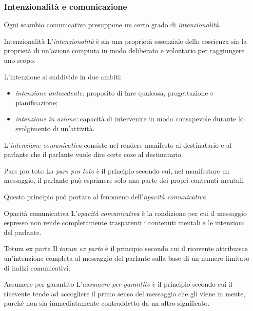 \documentclass[a4paper]{article}
\begin{document}
\subsubsection{Intenzionalità e comunicazione}
Ogni scambio comunicativo presuppone un certo grado di \emph{intenzionalità}.
\begin{snippetdefinition}{Intenzionalità}
    L'\emph{intenzionalità} è sia una proprietà essenziale della coscienza sia la proprietà di un'azione compiuta in modo deliberato e volontario per raggiungere uno scopo.
\end{snippetdefinition}
L'intenzione si suddivide in due ambiti:
\begin{itemize}
    \item \emph{intenzione antecedente:} proposito di fare qualcosa, progettazione e pianificazione;
    \item \emph{intenzione in azione:} capacità di intervenire in modo consapevole durante lo svolgimento di un'attività.
\end{itemize}
L'\emph{intenzione comunicativa} consiste nel rendere manifesto al destinatario e al parlante che il parlante vuole dire certe cose al destinatario.
\begin{snippetdefinition}{Pars pro toto}
    La \emph{pars pro toto} è il principio secondo cui, nel manifestare un messaggio, il parlante può esprimere solo una parte dei propri contenuti mentali.
\end{snippetdefinition}
Questo principio può portare al fenomeno dell'\emph{opacità comunicativa}.
\begin{snippetdefinition}{Opacità comunicativa}
    L'\emph{opacità comunicativa} è la condizione per cui il messaggio espresso non rende completamente trasparenti i contenuti mentali e le intenzioni del parlante.
\end{snippetdefinition}
\begin{snippetdefinition}{Totum ex parte}
    Il \emph{totum ex parte} è il principio secondo cui il ricevente attribuisce un'intenzione completa al messaggio del parlante sulla base di un numero limitato di indizi comunicativi.
\end{snippetdefinition}
\begin{snippetdefinition}{Assumere per garantito}
    L'\emph{assumere per garantito} è il principio secondo cui il ricevente tende ad accogliere il primo senso del messaggio che gli viene in mente, purché non sia immediatamente contraddetto da un altro significato.
\end{snippetdefinition}
\end{document}
